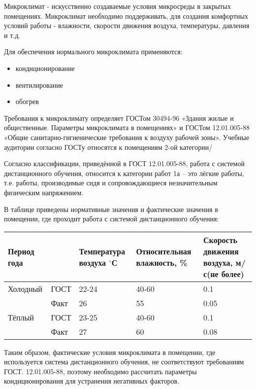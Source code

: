 Микроклимат - искусственно создаваемые условия микросреды в зак\-рытых помещениях.
Микроклимат необходимо поддерживать, для создания комфорт\-ных условий работы - влажности, скорости движения воздуха, тем\-пературы, давления и т.д.

Для обеспечения нормального микроклимата применяются:

\begin{itemize}
\item кондиционирование
\item вентилирование
\item обогрев
\end{itemize}

Требования к микроклимату определяет ГОСТом 30494-96 «Здания жи\-лые и общест\-венные. Параметры микроклимата в помещениях»  и ГОСТом 12.01.005-88 «Общие санитарно-гигиенические требования к воздуху рабочей зоны». Учебные аудито\-рии согласно ГОСТу относятся к помещениям 2-ой категории/

Согласно классификации, приведённой в ГОСТ 12.01.005-88, работа с сис\-темой дистан\-ционного обучения, относится к категории работ 1а – это лёгкие работы, т.е. работы, производимые сидя и сопровождающиеся незначитель\-ным физическим напряжением.

В таблице приведены нормативные значения и фактические значения в помещении, где проходит работа с сис\-темой дистанционного обучения:

\begin{table}[H]
\begin{center}
\begin{tabular}{|l|p{}|p{2.7cm}|p{3.2cm}|p{3cm}|}
\hline
Период года &  & Температура воздуха $^\circ$С & Относительная влажность, \% & Скорость движения воздуха, м/с(не более)\\
\hline
Холодный & ГОСТ & 22-24 & 40-60 & 0.1\\
 & Факт & 26 & 55 & 0.05\\
\hline
Тёплый & ГОСТ & 23-25 & 40-60 & 0.1\\
 & Факт & 27 & 60 & 0.08\\
\hline
\end{tabular}
\end{center}
\end{table}

Таким образом, фактические условия микроклимата в помещении, где используется система дистанционного обучения, не соответствуют требова\-ниям ГОСТ. 12.01.005-88, поэтому необходимо рассчитать параметры кондици\-онирования для устранения негативных факторов.

